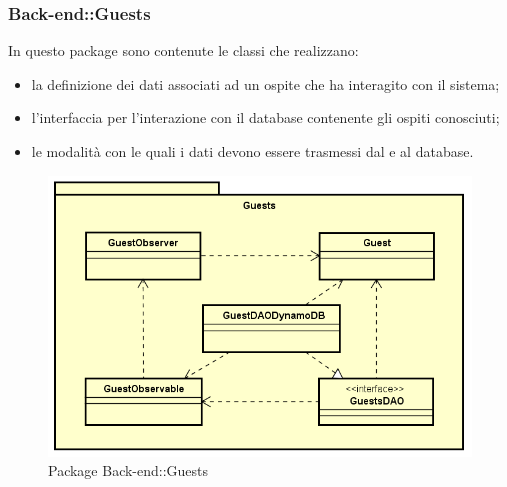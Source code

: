 \subsubsection{Back-end::Guests}
In questo package sono contenute le classi che realizzano:
\begin{itemize}
\item la definizione dei dati associati ad un ospite che ha interagito con il sistema;
\item l'interfaccia per l'interazione con il database contenente gli ospiti conosciuti;
\item le modalità con le quali i dati devono essere trasmessi dal e al database.
\end{itemize}
\begin{figure}[h] \centering \includegraphics[width=\textwidth,height=\textheight,keepaspectratio]{images/diagrams/back-end/Official_Backend_0304/Guest.png}
	\caption{Package Back-end::Guests}
\end{figure}
